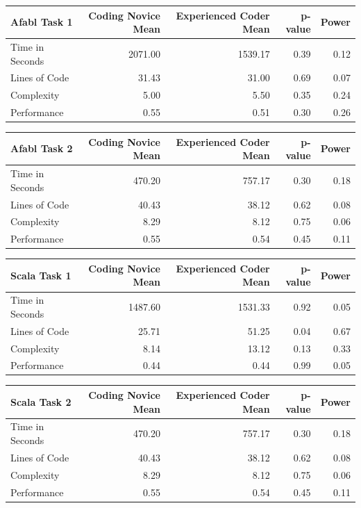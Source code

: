 \begin{center}
\begin{table}[h]
\begin{center}

\begin{tabular}{|l|r|r|r|r|}\hline
Afabl Task 1 & Coding Novice Mean & Experienced Coder Mean & p-value & Power\\\hline
Time in Seconds & 2071.00 & 1539.17 & 0.39 & 0.12\\
Lines of Code & 31.43 & 31.00 & 0.69 & 0.07\\
Complexity & 5.00 & 5.50 & 0.35 & 0.24\\
Performance & 0.55 & 0.51 & 0.30 & 0.26\\
\hline
\end{tabular}


\begin{tabular}{|l|r|r|r|r|}\hline
Afabl Task 2 & Coding Novice Mean & Experienced Coder Mean & p-value & Power\\\hline
Time in Seconds & 470.20 & 757.17 & 0.30 & 0.18\\
Lines of Code & 40.43 & 38.12 & 0.62 & 0.08\\
Complexity & 8.29 & 8.12 & 0.75 & 0.06\\
Performance & 0.55 & 0.54 & 0.45 & 0.11\\
\hline
\end{tabular}


\begin{tabular}{|l|r|r|r|r|}\hline
Scala Task 1 & Coding Novice Mean & Experienced Coder Mean & p-value & Power\\\hline
Time in Seconds & 1487.60 & 1531.33 & 0.92 & 0.05\\
Lines of Code & 25.71 & 51.25 & 0.04 & 0.67\\
Complexity & 8.14 & 13.12 & 0.13 & 0.33\\
Performance & 0.44 & 0.44 & 0.99 & 0.05\\
\hline
\end{tabular}


\begin{tabular}{|l|r|r|r|r|}\hline
Scala Task 2 & Coding Novice Mean & Experienced Coder Mean & p-value & Power\\\hline
Time in Seconds & 470.20 & 757.17 & 0.30 & 0.18\\
Lines of Code & 40.43 & 38.12 & 0.62 & 0.08\\
Complexity & 8.29 & 8.12 & 0.75 & 0.06\\
Performance & 0.55 & 0.54 & 0.45 & 0.11\\
\hline
\end{tabular}


\end{center}
\end{table}
\end{center}
